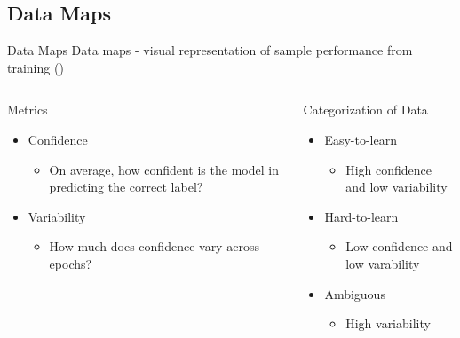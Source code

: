 \documentclass[
	11pt,
]{beamer}
\begin{document}
\subsection{Data Maps}
\begin{frame}[t]{Data Maps}
	Data maps - visual representation of sample performance from training
	(\cite{swayamdipta2020dataset})
	\vspace{0.5cm}
	\begin{columns}[t]
		\begin{column}{.5\textwidth}
			Metrics
			\begin{itemize}
				\item Confidence
				      \begin{itemize}
					      \item On average, how confident is the model in predicting the correct label?
				      \end{itemize}
				\item Variability
				      \begin{itemize}
					      \item How much does confidence vary across epochs?
				      \end{itemize}

			\end{itemize}
		\end{column}
		\begin{column}{.5\textwidth}
			Categorization of Data
			\begin{itemize}
				\item Easy-to-learn
				      \begin{itemize}
					      \item High confidence and
					            low variability
				      \end{itemize}
				\item Hard-to-learn
				      \begin{itemize}
					      \item Low confidence and low varability
				      \end{itemize}
				\item Ambiguous
				      \begin{itemize}
					      \item High variability
				      \end{itemize}
			\end{itemize}
		\end{column}
	\end{columns}
\end{frame}
\end{document}
